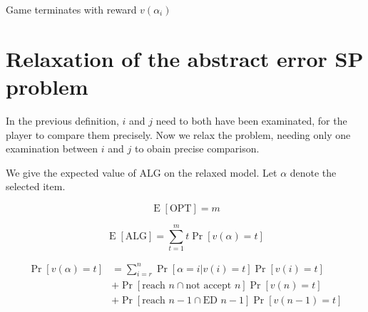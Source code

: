 \begin{algorithm}[H]
\caption{Game Process}
\label{algo1} 
\begin{algorithmic}[1]







		\State Game terminates with reward $v(\alpha_i)$
			
		
	\EndIf
	
	
\EndFor

\end{algorithmic}
\end{algorithm}


\section{Relaxation of the abstract error SP problem}
In the previous definition, $i$ and $j$ need to both have been examinated, for the player to compare them precisely.
Now we relax the problem, needing only one examination between $i$ and $j$ to obain precise comparison.

We give the expected value of $\text{ALG}$ on the relaxed model. Let $\alpha$ denote the selected item.

\begin{equation}
  \operatorname{E}\left[\text{OPT}\right]=m
\end{equation}

\begin{equation}
  \operatorname{E}[ \text{ALG} ]=\sum_{t=1}^m t\operatorname{Pr}\left[{v(\alpha)=t}\right]
\end{equation}

\begin{align}
  \operatorname{Pr}\left[{v(\alpha)=t}\right] &= \sum_{i=r}^n
  \operatorname{Pr}\left[{\alpha = i | v(i)=t}\right]
  \operatorname{Pr}\left[{v(i)=t}\right]\\&+
  \operatorname{Pr}\left[{\text{reach }n \cap \text{not accept }n}\right] \operatorname{Pr}\left[{v(n)=t}\right]\\&+
  \operatorname{Pr}\left[{\text{reach }n-1 \cap \text{ED }n-1}\right]\operatorname{Pr}\left[{v(n-1)=t}\right]
\end{align}

